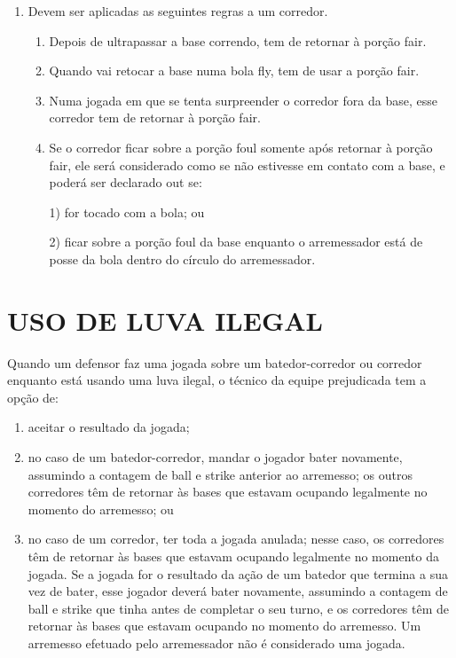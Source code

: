 \begin{enumerate}[label=(\alph*)]
	\item  Devem ser aplicadas as seguintes regras a um corredor.

	\begin{enumerate}[label=\roman*.]
		\item Depois de ultrapassar a base correndo, tem de retornar à porção \gls{fair}.
		\item Quando vai retocar a base numa bola \gls{fly}, tem de usar a porção \gls{fair}.
		\item Numa jogada em que se tenta surpreender o corredor fora da base, esse corredor tem de retornar à porção \gls{fair}.
		\item Se o corredor ficar sobre a porção \gls{foul} somente após retornar à porção \gls{fair}, ele será considerado como se não estivesse em contato com a base,  e poderá ser declarado \gls{out} se:

		1) for tocado com a bola; ou

		2) ficar sobre a porção \gls{foul} da base enquanto o arremessador está de posse da bola dentro do círculo do arremessador.
	\end{enumerate}
\end{enumerate}

\section{USO DE LUVA ILEGAL}

Quando um defensor faz uma jogada sobre um batedor-corredor ou corredor enquanto está usando uma luva ilegal, o técnico da equipe prejudicada tem a  opção de:
\begin{enumerate}[label=(\alph*)]\item   aceitar o resultado da jogada;
	\item  no caso de um batedor-corredor, mandar o jogador bater novamente, assumindo a contagem de \gls{ball} e \gls{strike} anterior ao arremesso; os outros corredores têm de retornar às bases que estavam ocupando legalmente no momento do arremesso; ou
	\item  no caso de um corredor, ter toda a jogada anulada; nesse caso, os corredores têm de retornar às bases que estavam ocupando legalmente no momento da  jogada. Se a jogada for o resultado da ação de um batedor que termina a sua  vez de bater, esse jogador deverá bater novamente, assumindo a contagem de \gls{ball} e \gls{strike} que tinha antes de completar o seu turno, e os corredores têm de retornar às bases que estavam ocupando no momento do arremesso. Um arremesso efetuado pelo arremessador não é considerado uma jogada.
\end{enumerate}

